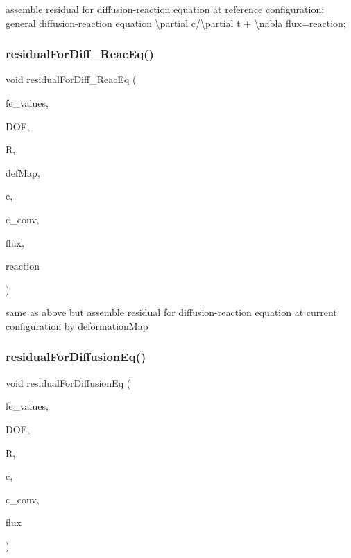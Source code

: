 assemble residual for diffusion-\/reaction equation at reference configuration\+: general diffusion-\/reaction equation \textbackslash{}partial c/\textbackslash{}partial t + \textbackslash{}nabla flux=reaction; \mbox{\label{class_residual_aa88dcdddfeefb2ba5f1f1196d8608b70}} 
\subsubsection{\texorpdfstring{residualForDiff\_ReacEq()}{residualForDiff\_ReacEq()}\hspace{0.1cm}{\footnotesize\ttfamily [2/2]}}
{\footnotesize\ttfamily void residual\+For\+Diff\+\_\+\+Reac\+Eq (\begin{DoxyParamCaption}\item[{const F\+E\+Values$<$ dim $>$ \&}]{fe\+\_\+values,  }\item[{unsigned int}]{D\+OF,  }\item[{dealii\+::\+Table$<$ 1, T $>$ \&}]{R,  }\item[{\mbox{\hyperlink{structdeformation_map}{deformation\+Map}}$<$ T, dim $>$ \&}]{def\+Map,  }\item[{dealii\+::\+Table$<$ 1, T $>$ \&}]{c,  }\item[{dealii\+::\+Table$<$ 1, double $>$ \&}]{c\+\_\+conv,  }\item[{dealii\+::\+Table$<$ 2, T $>$ \&}]{flux,  }\item[{dealii\+::\+Table$<$ 1, T $>$ \&}]{reaction }\end{DoxyParamCaption})}

same as above but assemble residual for diffusion-\/reaction equation at current configuration by deformation\+Map \mbox{\label{class_residual_a224462af849f5a1927bc90eb3795f2f2}} 
\subsubsection{\texorpdfstring{residualForDiffusionEq()}{residualForDiffusionEq()}\hspace{0.1cm}{\footnotesize\ttfamily [1/2]}}
{\footnotesize\ttfamily void residual\+For\+Diffusion\+Eq (\begin{DoxyParamCaption}\item[{const F\+E\+Values$<$ dim $>$ \&}]{fe\+\_\+values,  }\item[{unsigned int}]{D\+OF,  }\item[{dealii\+::\+Table$<$ 1, T $>$ \&}]{R,  }\item[{dealii\+::\+Table$<$ 1, T $>$ \&}]{c,  }\item[{dealii\+::\+Table$<$ 1, double $>$ \&}]{c\+\_\+conv,  }\item[{dealii\+::\+Table$<$ 2, T $>$ \&}]{flux }\end{DoxyParamCaption})}

